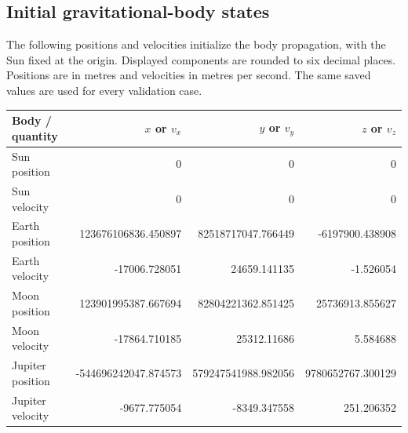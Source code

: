 \par\noindent\begin{minipage}{\linewidth}
\subsection{Initial gravitational-body states}
The following positions and velocities initialize the body propagation,
with the Sun fixed at the origin. Displayed components are rounded to six
decimal places. Positions are in metres and velocities in metres per second.
The same saved values are used for every validation case.
\begin{center}
\begin{tabular}{lrrr}
\toprule
Body / quantity & $x$ or $v_x$ & $y$ or $v_y$ & $z$ or $v_z$\\
\midrule
Sun position & 0 & 0 & 0\\
Sun velocity & 0 & 0 & 0\\
Earth position & 123676106836.450897 & 82518717047.766449 & -6197900.438908\\
Earth velocity & -17006.728051 & 24659.141135 & -1.526054\\
Moon position & 123901995387.667694 & 82804221362.851425 & 25736913.855627\\
Moon velocity & -17864.710185 & 25312.11686 & 5.584688\\
Jupiter position & -544696242047.874573 & 579247541988.982056 & 9780652767.300129\\
Jupiter velocity & -9677.775054 & -8349.347558 & 251.206352\\
\bottomrule
\end{tabular}
\end{center}
\end{minipage}
\clearpage
